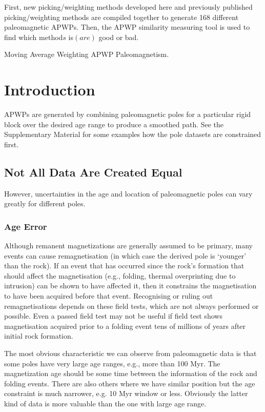\begin{summary}
First, new picking/weighting methods developed here and previously published
picking/weighting methods are compiled together to generate 168 different
paleomagnetic APWPs. Then, the APWP similarity measuring tool is used to find
which method\(s\) is$(are)$ good or bad.
\end{summary}

\begin{keywords}
  Moving Average \textendash{} Weighting \textendash{} APWP \textendash{}
  Paleomagnetism.
\end{keywords}

\section{Introduction}

APWPs are generated by combining paleomagnetic poles for a particular rigid
block over the desired age range to produce a smoothed path. See the
Supplementary Material for some examples how the pole datasets are constrained
first.

\subsection{Not All Data Are Created Equal}

However, uncertainties in the age and location of paleomagnetic poles can vary
greatly for different poles.

\subsubsection{Age Error}

Although remanent magnetizations are generally assumed to be primary, many
events can cause remagnetisation (in which case the derived pole is `younger'
than the rock). If an event that has occurred since the rock's formation that
should affect the magnetisation (e.g., folding, thermal overprinting due to
intrusion) can be shown to have affected it, then it constrains the
magnetisation to have been acquired before that event. Recognising or ruling
out remagnetisations depends on these field tests, which are not always
performed or possible. Even a passed field test may not be useful if field test
shows magnetisation acquired prior to a folding event tens of millions of years
after initial rock formation.

The most obvious characteristic we can observe from paleomagnetic data is that
some poles have very large age ranges, e.g., more than 100 Myr. The
magnetization age should be some time between the information of the rock and
folding events. There are also others where we have similar position but the age
constraint is much narrower, e.g. 10 Myr window or less. Obviously the latter
kind of data is more valuable than the one with large age range.

